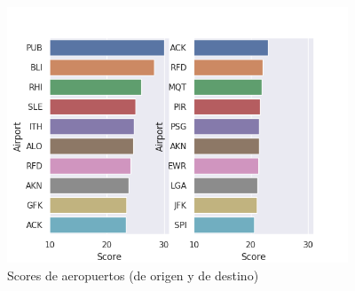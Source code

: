 \begin{figure}[hbtp]
  \centering
  \includegraphics[width=\textwidth, height=3in]{plots/airport_scores_2008.png}
  \caption{Scores de aeropuertos (de origen y de destino)}
  \label{fig:airport_scores}
\end{figure}

